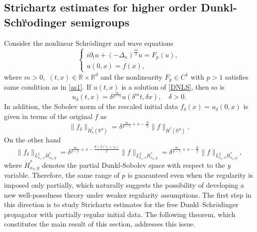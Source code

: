 \documentclass[a4paper,11pt, reqno]{amsart}
\theoremstyle{definition}
\theoremstyle{remark}
\numberwithin{equation}{section}
\begin{document}
	
	
	
	
	\subsection{Strichartz estimates for higher order Dunkl-Sch\"rodinger semigroups}\label{sec6}
	Consider the nonlinear Schr\"odinger and wave equations
	\begin{equation}\label{DNLS}
		\begin{cases}
			i\partial_t u +(-\Delta_\kappa)^{\frac{m}{2}} u= F_p(u), \\
			u(0, x)=f(x),
		\end{cases}
	\end{equation}
	where $m>0,$ $(t, x) \in \mathbb{R} \times \mathbb{R}^{d}$ and the nonlinearity $F_p \in C^1$ with $p>1$ satisfies same condition as in \eqref{as1}.
If $u(t,x)$ is a solution of \eqref{DNLS}, then so is
	\begin{equation*}
		u_{\delta}(t, x)= \delta^{\frac{m}{p-1}} u(\delta^{m} t, \delta x), \quad \delta>0.
	\end{equation*}
	In addition, the Sobolev norm of the rescaled initial data $f_{\delta}(x)=u_{\delta}(0, x)$ is given in terms of the original $f$ as 
	\begin{equation}\label{scalingD}
		\| f_{\delta}\|_{\dot{H}_\kappa^s(\mathbb{R}^{d})} =\delta^{\frac{m}{p-1}+s-\frac{N}{2}} \|f\|_{ \dot{H}^s(\mathbb{R}^{d})}.
	\end{equation}	On the other hand 
	$$\| f_{\delta}\|_{L_{\kappa_1, x}^2 \dot{H}_{\kappa_2, y}^s} =\delta^{\frac{m}{p-1}+s-\frac{d+2(\gamma_1+\gamma_2)}{2}} \|f\|_{L_{\kappa_1, x}^2 \dot{H}_{\kappa_2, y}^s}=\delta^{\frac{m}{p-1}+s-\frac{N }{2}} \|f\|_{L_{\kappa_1, x}^2 \dot{H}_{\kappa_2, y}^s},$$  where $ \dot{H}_{\kappa_2, y}^s$ denotes the partial Dunkl-Sobolev space with respect to the $y$ variable. 
	Therefore, the same range of $p$ is guaranteed even when the regularity is imposed only partially, which naturally suggests the possibility of developing a new well-posedness theory under weaker regularity assumptions. The first step in this direction is to study Strichartz estimates for the free Dunkl–Schrödinger propagator with partially regular initial data. The following theorem, which constitutes the main result of this section, addresses this issue.
\end{document}
